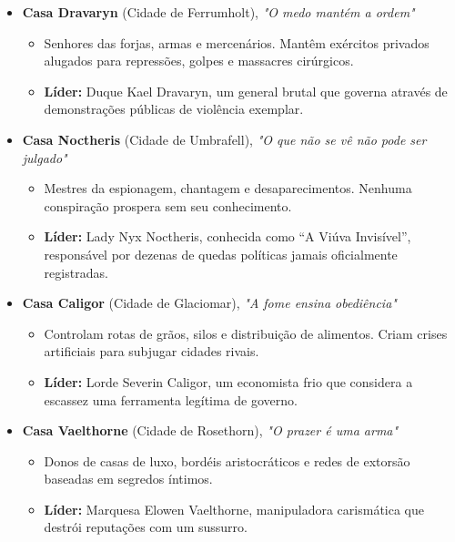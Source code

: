 \begin{itemize}
    \item \textbf{\ringmfamily Casa Dravaryn} (Cidade de Ferrumholt), \textit{"O medo mantém a ordem"}
    \begin{itemize}
        \item Senhores das forjas, armas e mercenários. Mantêm exércitos privados alugados para repressões, golpes e massacres cirúrgicos.
        \item \textbf{\ringmfamily Líder:} Duque Kael Dravaryn, um general brutal que governa através de demonstrações públicas de violência exemplar.
    \end{itemize}
    
    \item \textbf{\ringmfamily Casa Noctheris} (Cidade de Umbrafell), \textit{"O que não se vê não pode ser julgado"}
    \begin{itemize}
        \item Mestres da espionagem, chantagem e desaparecimentos. Nenhuma conspiração prospera sem seu conhecimento.
        \item \textbf{\ringmfamily Líder:} Lady Nyx Noctheris, conhecida como “A Viúva Invisível”, responsável por dezenas de quedas políticas jamais oficialmente registradas.
    \end{itemize}
    
    \item \textbf{\ringmfamily Casa Caligor} (Cidade de Glaciomar), \textit{"A fome ensina obediência"}
    \begin{itemize}
        \item Controlam rotas de grãos, silos e distribuição de alimentos. Criam crises artificiais para subjugar cidades rivais.
        \item \textbf{\ringmfamily Líder:} Lorde Severin Caligor, um economista frio que considera a escassez uma ferramenta legítima de governo.
    \end{itemize}
    
    \item \textbf{\ringmfamily Casa Vaelthorne} (Cidade de Rosethorn), \textit{"O prazer é uma arma"}
    \begin{itemize}
        \item Donos de casas de luxo, bordéis aristocráticos e redes de extorsão baseadas em segredos íntimos.
        \item \textbf{\ringmfamily Líder:} Marquesa Elowen Vaelthorne, manipuladora carismática que destrói reputações com um sussurro.
    \end{itemize}
    

\end{itemize}

